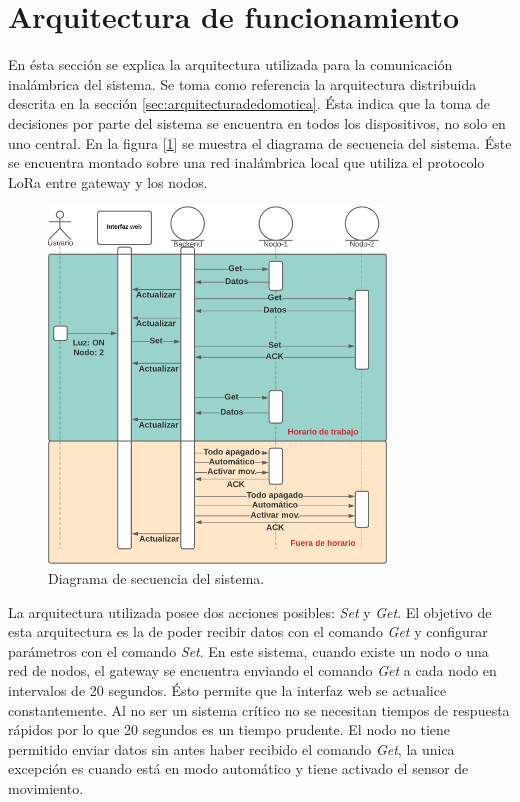 \section{Arquitectura de funcionamiento}

En ésta sección se explica la arquitectura utilizada para la comunicación inalámbrica del sistema.
Se toma como referencia la arquitectura distribuida descrita en la sección \ref{sec:arquitecturadedomotica}. Ésta indica que la toma de decisiones por parte del sistema se encuentra en todos los dispositivos, no solo en uno central.
En la figura [\ref{fig:diagramadesecuencia}] se muestra el diagrama de secuencia del sistema. Éste se encuentra montado sobre una red inalámbrica local que utiliza el protocolo LoRa entre gateway y los nodos.

\begin{figure}[ht!]
	\centering
	\includegraphics[width=0.8\textwidth]{./Figures/diagramadesecuencia.png}
	\caption{Diagrama de secuencia del sistema.}
	\label{fig:diagramadesecuencia}
\end{figure}

La arquitectura utilizada posee dos acciones posibles: {\textit{Set}} y {\textit{Get}}. El objetivo de esta arquitectura es la de poder recibir datos con el comando {\textit{Get}} y configurar parámetros con el comando {\textit{Set}}.
En este sistema, cuando existe un nodo o una red de nodos, el gateway se encuentra enviando el comando {\textit{Get}} a cada nodo en intervalos de 20 segundos. Ésto permite que la interfaz web se actualice constantemente. Al no ser un sistema crítico no se necesitan tiempos de respuesta rápidos por lo que 20 segundos es un tiempo prudente.
El nodo no tiene permitido enviar datos sin antes haber recibido el comando {\textit{Get}}, la unica excepción es cuando está en modo automático y tiene activado el sensor de movimiento.


